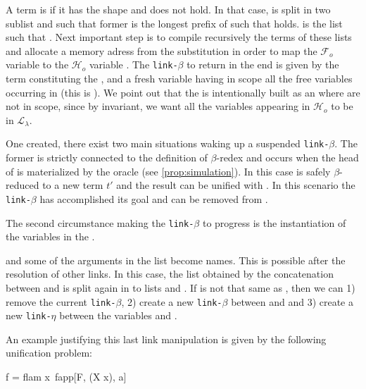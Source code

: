 \documentclass[sigconf,natbib=false,review]{acmart}
\newcommand{\llambda}{\ensuremath{\mathcal{L}_\lambda}\xspace}
\newcommand{\linkbeta}{\texttt{link-}\ensuremath{\beta}\xspace}
\newcommand{\linketa}{\texttt{link-}\ensuremath{\eta}\xspace}
\newcommand{\Fo}{\ensuremath{\mathcal{F}_{\!o}\xspace}} %
\newcommand{\Ho}{\ensuremath{\mathcal{H}_o}\xspace}
\begin{document}
A term is \maybebeta if it has the shape  and
 does not hold. In that case,  is split in two
sublist  and  such that former is the longest prefix of
 such that  holds.  is the list
such that . Next important step is to compile
recursively the terms of these lists and allocate a memory adress 
from the substitution in order to map the \Fo variable  to
the \Ho variable . The \linkbeta to return in the end is given 
by the term  constituting the \rhs,
and a fresh variable  having in scope all the free variables occurring
in  (this is \lhs). We point out that the \rhs is intentionally
built as an  where  are not in scope, since by 
invariant, we want all the variables appearing in \Ho to be in \llambda.

One created, there exist two main situations waking up a suspended \linkbeta.
The former is strictly connected to the definition of $\beta$-redex and occurs
when the head of \rhs is materialized by the oracle (see
\cref{prop:simulation}). In this case \rhs is safely
$\beta$-reduced to a new term $t'$ and the result can be unified with \lhs. In
this scenario the \linkbeta has accomplished its goal and can be removed from
\linkStore.

The second circumstance making the \linkbeta to progress is the instantiation 
of the variables in the . 

and some of the arguments in the  list become names. This is
possible after the resolution of other links. In this case, the list 
obtained by the concatenation between  and  is split
again in to lists  and . If  is not that
same as , then we can 1) remove the current \linkbeta, 2) create a
new \linkbeta between  and  and 3)
create a new \linketa between the variables  and .

An example justifying this last link manipulation is given by the following
unification problem:

\begin{elpicode}
  f = flam x\ fapp[F, (X x), a] %
\end{elpicode}
\end{document}
